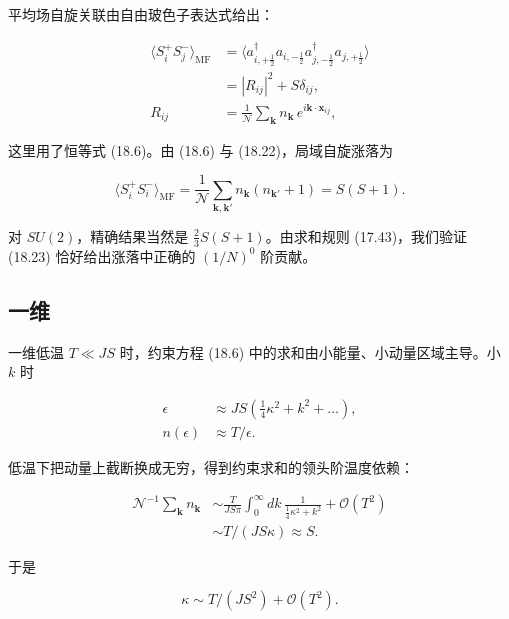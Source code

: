平均场自旋关联由自由玻色子表达式给出：

\begin{align*}
\langle S _ {i} ^ {+} S _ {j} ^ {-} \rangle_{\mathrm{MF}} & = \langle a _ {i, + \frac {1}{2}} ^ {\dagger} a_{i, - \frac {1}{2}} a_{j, - \frac {1}{2}} ^ {\dagger} a_{j, + \frac {1}{2}} \rangle\\
& = \left| R _ {ij} \right| ^ {2} + S \delta_{ij} ,\\
R _ {ij} & = \frac {1}{\mathcal {N}} \sum_ {\mathbf {k}} n _ {\mathbf {k}} \, e ^ {i \mathbf {k} \cdot \mathbf {x} _ {ij}} ,
\tag{18.22}
\end{align*}

这里用了恒等式 (18.6)。由 (18.6) 与 (18.22)，局域自旋涨落为

\begin{equation*}
\langle S _ {i} ^ {+} S _ {i} ^ {-} \rangle_{\mathrm{MF}} = \frac {1}{\mathcal {N}} \sum_{\mathbf {k}, \mathbf {k} '} n _ {\mathbf {k}} \left( n _ {\mathbf {k} '} + 1 \right) = S ( S + 1 ).
\tag{18.23}
\end{equation*}

对 $SU(2)$，精确结果当然是 $\frac{2}{3}S(S+1)$。由求和规则 (17.43)，我们验证 (18.23) 恰好给出涨落中正确的 $(1/N)^{0}$ 阶贡献。

\subsection{一维}

一维低温 $T \ll JS$ 时，约束方程 (18.6) 中的求和由小能量、小动量区域主导。小 $k$ 时

\begin{align*}
\epsilon & \approx J S \left( \frac {1}{4} \kappa^ {2} + k ^ {2} + \dots \right) ,\\
n ( \epsilon ) & \approx T / \epsilon .
\tag{18.24}
\end{align*}

低温下把动量上截断换成无穷，得到约束求和的领头阶温度依赖：

\begin{align*}
\mathcal {N} ^ {- 1} \sum_ {\mathbf {k}} n _ {\mathbf {k}} & \sim \frac {T}{J S \pi} \int_ {0} ^ {\infty} d k \, \frac {1}{\frac {1}{4} \kappa^ {2} + k ^ {2}} + \mathcal {O} ( T ^ {2} )\\
& \sim T / ( J S \kappa ) \approx S.
\tag{18.25}
\end{align*}

于是

\begin{equation*}
\kappa \sim T / ( J S ^ {2} ) + \mathcal {O} ( T ^ {2} ).
\tag{18.26}
\end{equation*}

